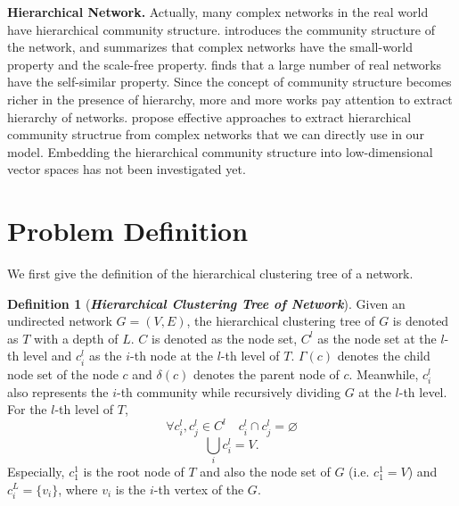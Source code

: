 \documentclass{article}
\theoremstyle{definition}
\newtheorem{defn}{Definition}
\begin{document}
	 

	\textbf{Hierarchical Network.} Actually, many complex networks in the real world have hierarchical community structure. 
	\cite{newman2003structure} introduces the community structure of the network, and summarizes that complex networks have the small-world property and the scale-free property. \cite{song2005self} finds that a large number of real networks have the self-similar property. 
	Since the concept of community structure becomes richer in the presence of hierarchy, more and more works pay attention to extract hierarchy of networks.
	\cite{clauset2008hierarchical}
	\cite{Yang2013Hierarchical}\cite{sales-pardo2007extracting}\cite{Lancichinetti2008Detecting} propose effective approaches to extract hierarchical community structrue from complex networks that we can directly use in our model.
	Embedding the hierarchical community structure into low-dimensional vector spaces has not been investigated yet.

	\section{Problem Definition}
		We first give the definition of the hierarchical clustering tree \cite{clauset2008hierarchical} of a network.
		\begin{defn}[\textbf{\emph{Hierarchical Clustering Tree of Network}}]
			Given an undirected network $G = (V, E)$, the hierarchical clustering tree of $G$ is denoted as $T$ with a depth of $L$. $C$ is denoted as the node set,
			$C^l$ as the node set at the $l$-th level and $c^l_i$ as the $i$-th node at the $l$-th level of $T$. $\Gamma(c)$ denotes the child node set of the node $c$ and $\delta(c)$ denotes the parent node of $c$. Meanwhile, $c^l_i$ also represents the $i$-th community while recursively dividing $G$ at the $l$-th level. For the $l$-th level of $T$,
				\[
				\forall c^l_i, c^l_j \in C^l \quad c^l_i \cap c^l_j = \varnothing
				\]
				\[
				\bigcup_i c_i^l = V.
				\]
			Especially, $c_1^1$ is the root node of $T$ and also the node set of $G$ (i.e. $c_1^1 = V$) and $c_i^L = \{v_i\}$, where $v_i$ is the $i$-th vertex of the $G$.
		\end{defn}
		
\end{document}
